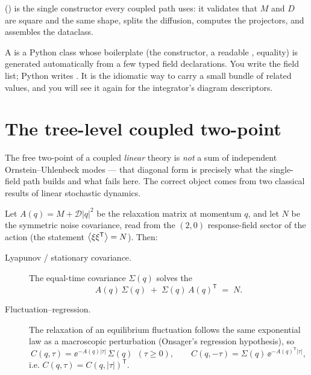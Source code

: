  () is
the single constructor every coupled path uses: it validates that $M$ and $D$
are square and the same shape, splits the diffusion, computes the projectors,
and assembles the dataclass.

\begin{note}
A  is a Python class whose boilerplate (the constructor, a
readable , equality) is generated automatically from a few typed
field declarations. You write the field list; Python writes
. It is the idiomatic way to carry a small bundle of related
values, and you will see it again for the integrator's diagram descriptors.
\end{note}

\section{The tree-level coupled two-point}

The free two-point of a coupled \emph{linear} theory is \emph{not} a sum of
independent Ornstein--Uhlenbeck modes --- that diagonal form is precisely what
the single-field path builds and what fails here. The correct object comes from
two classical results of linear stochastic dynamics.

Let $A(q)=M+\mathcal{D}|q|^{2}$ be the relaxation matrix at momentum $q$, and
let $N$ be the symmetric noise covariance, read from the $(2,0)$ response-field
sector of the action (the statement $\left\langle \xi\xi^{\mathsf T} \right\rangle=N$). Then:

\begin{description}
  \item[Lyapunov / stationary covariance.] The equal-time covariance
        $\Sigma(q)$ solves the 
        \begin{equation}
          A(q)\,\Sigma(q)\;+\;\Sigma(q)\,A(q)^{\mathsf T}\;=\;N.
          \label{eq:lyap}
        \end{equation}
  \item[Fluctuation--regression.] The relaxation of an equilibrium fluctuation
        follows the same exponential law as a macroscopic perturbation
        (Onsager's regression hypothesis), so
        \begin{equation}
          C(q,\tau)=\ee^{-A(q)|\tau|}\,\Sigma(q)\ \ (\tau\ge0),
          \qquad
          C(q,-\tau)=\Sigma(q)\,\ee^{-A(q)^{\mathsf T}|\tau|},
          \label{eq:fdt}
        \end{equation}
        i.e. $C(q,\tau)=C(q,|\tau|)^{\mathsf T}$.
\end{description}

